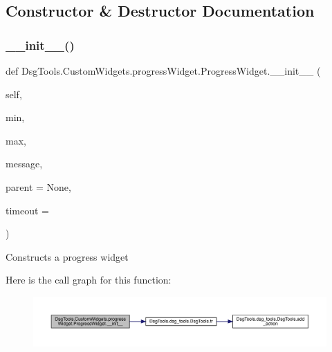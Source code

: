 \subsection{Constructor \& Destructor Documentation}
\mbox{\label{class_dsg_tools_1_1_custom_widgets_1_1progress_widget_1_1_progress_widget_a3c1ac200ea1b4dd83cb1eb2afcc44f33}} 
\subsubsection{\texorpdfstring{\+\_\+\+\_\+init\+\_\+\+\_\+()}{\_\_init\_\_()}}
{\footnotesize\ttfamily def Dsg\+Tools.\+Custom\+Widgets.\+progress\+Widget.\+Progress\+Widget.\+\_\+\+\_\+init\+\_\+\+\_\+ (\begin{DoxyParamCaption}\item[{}]{self,  }\item[{}]{min,  }\item[{}]{max,  }\item[{}]{message,  }\item[{}]{parent = {\ttfamily None},  }\item[{}]{timeout = {} }\end{DoxyParamCaption})}

\begin{DoxyVerb}Constructs a progress widget
\end{DoxyVerb}
 Here is the call graph for this function\+:
\nopagebreak
\begin{figure}[H]
\begin{center}
\leavevmode
\includegraphics[width=350pt]{class_dsg_tools_1_1_custom_widgets_1_1progress_widget_1_1_progress_widget_a3c1ac200ea1b4dd83cb1eb2afcc44f33_cgraph}
\end{center}
\end{figure}


